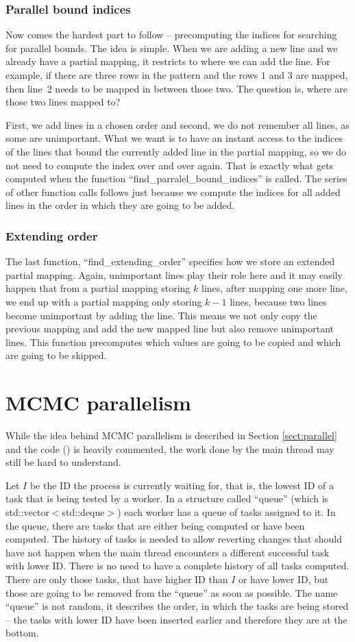 \subsubsection{Parallel bound indices}
Now comes the hardest part to follow -- precomputing the indices for searching for parallel bounds. The idea is simple. When we are adding a new line and we already have a partial mapping, it restricts to where we can add the line. For example, if there are three rows in the pattern and the rows $1$ and $3$ are mapped, then line~$2$ needs to be mapped in between those two. The question is, where are those two lines mapped to?

First, we add lines in a chosen order and second, we do not remember all lines, as some are unimportant. What we want is to have an instant access to the indices of the lines that bound the currently added line in the partial mapping, so we do not need to compute the index over and over again. That is exactly what gets computed when the function ``find\_parralel\_bound\_indices'' is called. The series of other function calls follows just because we compute the indices for all added lines in the order in which they are going to be added.

\subsubsection{Extending order}
The last function, ``find\_extending\_order'' specifies how we store an extended partial mapping. Again, unimportant lines play their role here and it may easily happen that from a partial mapping storing $k$ lines, after mapping one more line, we end up with a partial mapping only storing $k-1$ lines, because two lines become unimportant by adding the line. This means we not only copy the previous mapping and add the new mapped line but also remove unimportant lines. This function precomputes which values are going to be copied and which are going to be skipped.
\pagebreak
\section{MCMC parallelism}
While the idea behind MCMC parallelism is described in Section \ref{sect:parallel} and the code (\cite{program}) is heavily commented, the work done by the main thread may still be hard to understand.

Let $I$ be the ID the process is currently waiting for, that is, the lowest ID of a task that is being tested by a worker. In a structure called ``queue'' (which is std::vector$<$std::deque$>$) each worker has a queue of tasks assigned to it. In the queue, there are tasks that are either being computed or have been computed. The history of tasks is needed to allow reverting changes that should have not happen when the main thread encounters a different successful task with lower ID. There is no need to have a complete history of all tasks computed. There are only those tasks, that have higher ID than $I$ or have lower ID, but those are going to be removed from the ``queue'' as soon as possible. The name ``queue'' is not random, it describes the order, in which the tasks are being stored -- the tasks with lower ID have been inserted earlier and therefore they are at the bottom.

